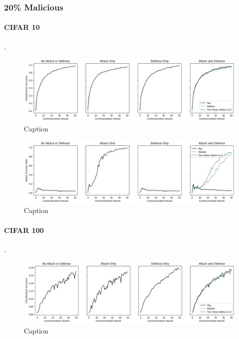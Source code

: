 \documentclass{article} %
\begin{document}
%
\pagebreak
\subsubsection{20\% Malicious}


%
\paragraph{CIFAR 10}.

\begin{figure}[H]
    \centering
    \includegraphics[width=\textwidth]{cifar_10/classic/tag/distributed/alpha10000--alpha_val10000/visuals/clean_accuracy--n_malicious2--beta0.2.png}
    \caption{Caption}
    \label{fig:my_label}
\end{figure}

\begin{figure}[H]
    \centering
    \includegraphics[width=\textwidth]{cifar_10/classic/tag/distributed/alpha10000--alpha_val10000/visuals/pois_accuracy--n_malicious2--beta0.2.png}
    \caption{Caption}
    \label{fig:my_label}
\end{figure}


%
\paragraph{CIFAR 100}.

\begin{figure}[H]
    \centering
    \includegraphics[width=\textwidth]{cifar_100/classic/tag/distributed/alpha10000--alpha_val10000/visuals/clean_accuracy--n_malicious2--beta0.2.png}
    \caption{Caption}
    \label{fig:my_label}
\end{figure}
\end{document}
